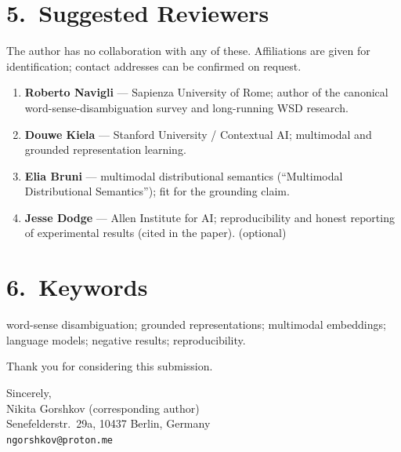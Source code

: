 \documentclass[11pt]{article}
\begin{document}
\section*{5.~Suggested Reviewers}
The author has no collaboration with any of these. Affiliations are given for
identification; contact addresses can be confirmed on request.
\begin{enumerate}[leftmargin=1.6em]
  \item \textbf{Roberto Navigli} --- Sapienza University of Rome; author of the
    canonical word-sense-disambiguation survey and long-running WSD research.
  \item \textbf{Douwe Kiela} --- Stanford University / Contextual AI; multimodal
    and grounded representation learning.
  \item \textbf{Elia Bruni} --- multimodal distributional semantics
    (``Multimodal Distributional Semantics''); fit for the grounding claim.
  \item \textbf{Jesse Dodge} --- Allen Institute for AI; reproducibility and
    honest reporting of experimental results (cited in the paper). (optional)
\end{enumerate}

\section*{6.~Keywords}
word-sense disambiguation; grounded representations; multimodal embeddings;
language models; negative results; reproducibility.

\bigskip
\noindent Thank you for considering this submission.

\bigskip
\noindent Sincerely,\\[0.5em]
Nikita Gorshkov (corresponding author)\\
Senefelderstr.\ 29a, 10437 Berlin, Germany\\
\texttt{ngorshkov@proton.me}
\end{document}
